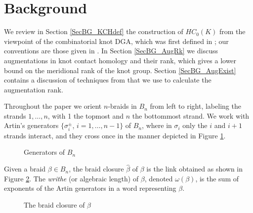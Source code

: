 \documentclass[11pt]{amsart}
\def\s{{\sigma}}
\theoremstyle{definition}
\begin{document}
\section{Background}
\label{SecBG}

  We review in Section \ref{SecBG_KCHdef} the construction of $HC_0(K)$ from the viewpoint of the combinatorial knot DGA, which was first defined in \cite{Ng08}; our conventions are those given in \cite{Ng12}. In Section \ref{SecBG_AugRk} we discuss augmentations in knot contact homology and their rank, which gives a lower bound on the meridional rank of the knot group. Section \ref{SecBG_AugExist} contains a discussion of techniques from \cite{Cor13a} that we use to calculate the augmentation rank.

  Throughout the paper we orient $n$-braids in $B_n$ from left to right, labeling the strands $1,\ldots, n$, with 1 the topmost and $n$ the bottommost strand. We work with Artin's generators $\{\sigma_i^{\pm}$, $i=1,\ldots,n-1\}$ of $B_n$, where in $\s_i$ only the $i$ and $i+1$ strands interact, and they cross once in the manner depicted in Figure \ref{fig:BraidGens}.
      \begin{figure}[ht]
        \caption{Generators of $B_n$}
        \label{fig:BraidGens}
      \end{figure}
    Given a braid $\beta\in B_n$, the braid closure $\hat{\beta}$ of $\beta$ is the link obtained as shown in Figure \ref{fig:BClosure}. The \emph{writhe} (or algebraic length) of $\beta$, denoted $\omega(\beta)$, is the sum of exponents of the Artin generators in a word representing $\beta$.

    \begin{figure}[ht]
      \caption{The braid closure of $\beta$}
      \label{fig:BClosure}
    \end{figure}
\end{document}
